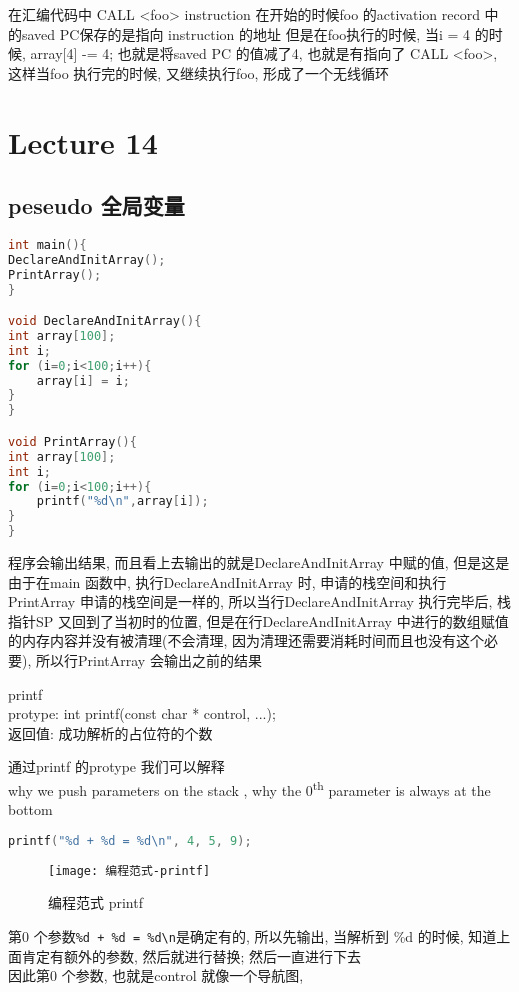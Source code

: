 \documentclass{article}
\begin{document}
在汇编代码中
CALL <foo>
instruction
在开始的时候foo 的activation record 中的saved PC保存的是指向 instruction 的地址
但是在foo执行的时候, 当i = 4 的时候, array[4] -= 4; 也就是将saved PC 的值减了4, 也就是有指向了 CALL <foo>, 这样当foo 执行完的时候, 又继续执行foo, 形成了一个无线循环

\section{Lecture 14}
\subsection{peseudo 全局变量}
\begin{lstlisting}[language = C]
int main(){
DeclareAndInitArray();
PrintArray();
}

void DeclareAndInitArray(){
int array[100];
int i;
for (i=0;i<100;i++){
	array[i] = i;
}
}

void PrintArray(){
int array[100];
int i;
for (i=0;i<100;i++){
	printf("%d\n",array[i]);
}
}
\end{lstlisting}
程序会输出结果, 而且看上去输出的就是DeclareAndInitArray 中赋的值, 但是这是由于在main 函数中, 执行DeclareAndInitArray 时, 申请的栈空间和执行PrintArray 申请的栈空间是一样的, 所以当行DeclareAndInitArray 执行完毕后, 栈指针SP 又回到了当初时的位置, 但是在行DeclareAndInitArray 中进行的数组赋值的内存内容并没有被清理(不会清理, 因为清理还需要消耗时间而且也没有这个必要), 所以行PrintArray 会输出之前的结果

printf\\
protype:	int printf(const char * control, ...);\\
返回值: 成功解析的占位符的个数

通过printf 的protype 我们可以解释\\
why we push parameters on the stack , why the $0$\textsuperscript{th} parameter is always at the bottom

\begin{lstlisting}[language = C]
printf("%d + %d = %d\n", 4, 5, 9);
\end{lstlisting}
\begin{figure}[htbp]
	\centering
	\texttt{[image: 编程范式-printf]}\\
	\caption{编程范式 printf}\label{fig.编程范式.printf}
\end{figure}

第0 个参数\verb "%d + %
因此第0 个参数, 也就是control 就像一个导航图,
\end{document}
